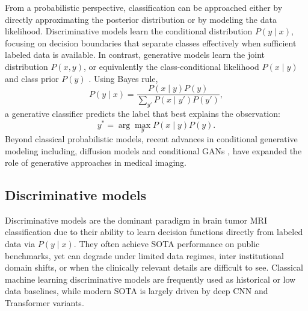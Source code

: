 From a probabilistic perspective, classification can be approached either by directly approximating the posterior distribution or by modeling the data likelihood. Discriminative models learn the conditional distribution $P(y\mid x)$, focusing on decision boundaries that separate classes effectively when sufficient labeled data is available. In contrast, generative models learn the joint distribution $P(x,y)$, or equivalently the class-conditional likelihood $P(x\mid y)$ and class prior $P(y)$ \citep{mackowiak2021generative}. Using Bayes rule,
\begin{equation}
P(y\mid x) = \frac{P(x\mid y)P(y)}{\sum_{y'} P(x\mid y')P(y')},
\end{equation}
a generative classifier predicts the label that best explains the observation:
\begin{equation}
y^* = \arg\max_y P(x\mid y)P(y).
\end{equation}
Beyond classical probabilistic models, recent advances in conditional generative modeling including, diffusion models \cite{ukita2025imageclassificationusingdiffusion} and conditional GANs \cite{mirza2014conditionalgenerativeadversarialnets}, have expanded the role of generative approaches in medical imaging.

\subsection{Discriminative models}

Discriminative models are the dominant paradigm in brain tumor MRI classification due to their ability to learn decision functions directly from labeled data via $P(y\mid x)$. They often achieve SOTA performance on public benchmarks, yet can degrade under limited data regimes, inter institutional domain shifts, or when the clinically relevant details are difficult to see. Classical machine learning discriminative models are frequently used as historical or low data baselines, while modern SOTA is largely driven by deep CNN and Transformer variants. 

